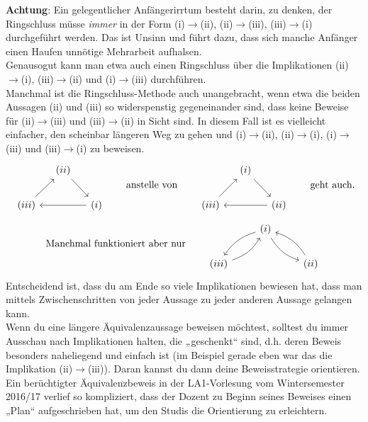 \begin{bem}
 \textbf{Achtung}: Ein gelegentlicher Anfängerirrtum besteht darin, zu denken, der Ringschluss müsse \emph{immer} in der Form (i)$\to$(ii), (ii)$\to$(iii), (iii)$\to$(i) durchgeführt werden. Das ist Unsinn und führt dazu, dass sich manche Anfänger einen Haufen unnötige Mehrarbeit aufhalsen. \\
 Genausogut kann man etwa auch einen Ringschluss über die Implikationen (ii)$\to$(i), (iii)$\to$(ii) und (i)$\to$(iii) durchführen. \\
 Manchmal ist die Ringschluss-Methode auch unangebracht, wenn etwa die beiden Aussagen (ii) und (iii) so widerspenstig gegeneinander sind, dass keine Beweise für (ii)$\to$(iii) und (iii)$\to$(ii) in Sicht sind. In diesem Fall ist es vielleicht einfacher, den scheinbar längeren Weg zu gehen und (i)$\to$(ii), (ii)$\to$(i), (i)$\to$(iii) und (iii)$\to$(i) zu beweisen.
\[ \begin{tikzcd}[column sep=small]
     & (ii) \ar[rd] & \\
     (iii)\ar[ru] && (i)\ar[ll]
    \end{tikzcd}\qquad\text{anstelle von}\qquad\begin{tikzcd}[column sep=small]
     & (i) \ar[rd] & \\
     (iii)\ar[ru] && (ii)\ar[ll]    
    \end{tikzcd}\qquad\text{geht auch.} \]
\[ \text{Manchmal funktioniert aber nur}\qquad
  \begin{tikzcd}
        & (i) \ar[ld, bend right=20]  \ar[rd, bend right=20] & \\
     (iii)\ar[ru, bend right=20] && (ii) \ar[lu, bend right=20]
  \end{tikzcd} \]
Entscheidend ist, dass du am Ende so viele Implikationen bewiesen hat, dass man mittels Zwischenschritten von jeder Aussage zu jeder anderen Aussage gelangen kann. \\[0.5em]
Wenn du eine längere Äquivalenzaussage beweisen möchtest, solltest du immer Ausschau nach Implikationen halten, die „geschenkt“ sind, d.h. deren Beweis besonders naheliegend und einfach ist (im Beispiel gerade eben war das die Implikation (ii)$\to$(iii)). Daran kannst du dann deine Beweisstrategie orientieren. Ein berüchtigter Äquivalenzbeweis in der LA1-Vorlesung vom Wintersemester 2016/17 verlief so kompliziert, dass der Dozent zu Beginn seines Beweises einen „Plan“ aufgeschrieben hat, um den Studis die Orientierung zu erleichtern.
    \begin{figure}[H]
\begin{center}

\end{center}
\end{figure}
\end{bem}
